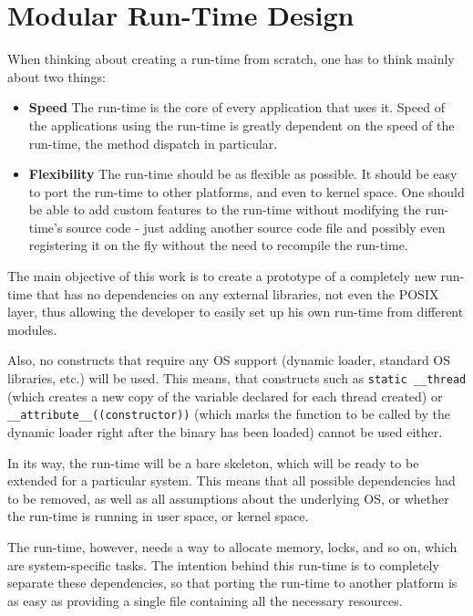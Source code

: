 \chapter{Modular Run-Time Design}

When thinking about creating a run-time from scratch, one has to think mainly about two things:

\begin{itemize}
  \item{\bf{Speed}} The run-time is the core of every application that uses it. Speed of the applications using the run-time is greatly dependent on the speed of the run-time, the method dispatch in particular.
  \item{\bf{Flexibility}} The run-time should be as flexible as possible. It should be easy to port the run-time to other platforms, and even to kernel space. One should be able to add custom features to the run-time without modifying the run-time's source code - just adding another source code file and possibly even registering it on the fly without the need to recompile the run-time.
\end{itemize}

The main objective of this work is to create a prototype of a completely new run-time that has no dependencies on any external libraries, not even the POSIX layer, thus allowing the developer to easily set up his own run-time from different modules.

Also, no constructs that require any OS support (dynamic loader, standard OS libraries, etc.) will be used. This means, that constructs such as \verb=static __thread= (which creates a new copy of the variable declared for each thread created) or \newline{} \verb=__attribute__((constructor))= (which marks the function to be called by the dynamic loader right after the binary has been loaded) cannot be used either.

In its way, the run-time will be a bare skeleton, which will be ready to be extended for a particular system. This means that all possible dependencies had to be removed, as well as all assumptions about the underlying OS, or whether the run-time is running in user space, or kernel space.

The run-time, however, needs a way to allocate memory, locks, and so on, which are system-specific tasks. The intention behind this run-time is to completely separate these dependencies, so that porting the run-time to another platform is as easy as providing a single file containing all the necessary resources.

